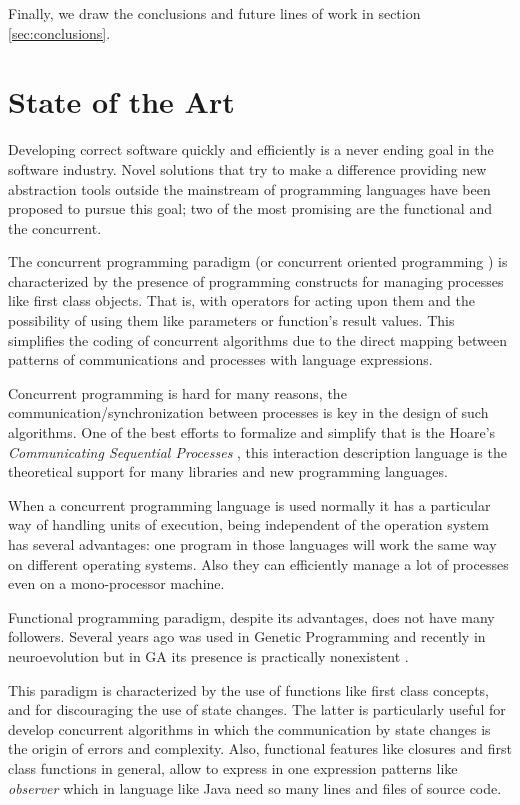 \documentclass[runningheads,a4paper]{llncs}
\begin{document}
Finally, we draw the conclusions and future lines of work in section \ref{sec:conclusions}.


\section{State of the Art}
\noindent Developing correct software quickly and efficiently is a
never ending goal in the software industry. Novel solutions that try
to make a difference providing new abstraction tools outside the
mainstream of programming languages have been proposed to pursue this
goal; two of the most promising are the functional and the concurrent.

The concurrent programming paradigm (or concurrent oriented programming \cite{Armstrong2003}) is characterized by the presence of programming constructs for managing processes like first class objects. That is, with operators for acting upon them and the possibility of using them like parameters or function's result values. This simplifies the coding of concurrent algorithms due to the direct mapping between patterns of communications and processes with language expressions.

Concurrent programming is hard for many reasons, the communication/synchronization between processes is key in the design of such algorithms. One of the best efforts to formalize and simplify that is the Hoare’s {\em Communicating Sequential Processes} \cite{Hoare:1978:CSP:359576.359585}, this interaction description language is the theoretical support for many libraries and new programming languages.

When a concurrent programming language is used normally it has a
particular way of handling units of execution, being independent of
the operation system has several advantages: one program in those
languages will work the same way on different operating systems. Also
they can efficiently manage a lot of processes even on a
mono-processor machine.


Functional programming paradigm, despite its advantages, does not have
many followers. Several years ago was used in Genetic Programming
\cite{Briggs:2008:FGP:1375341.1375345,Huelsbergen:1996:TSE:1595536.1595579,walsh:1999:AFSFESIHLP}
and recently in neuroevolution \cite{Sher2013} but in GA its presence
is practically nonexistent \cite{Hawkins:2001:GFG:872017.872197}. 

This paradigm is characterized by the use of functions like first
class concepts, and for discouraging the use of state changes. The
latter is particularly useful for develop concurrent algorithms in
which the communication by state changes is the origin of errors and
complexity. Also, functional features like closures and first class
functions in general, allow to express in one expression patterns like
\emph{observer} which in language like Java need so many lines and
files of source code.
\end{document}
